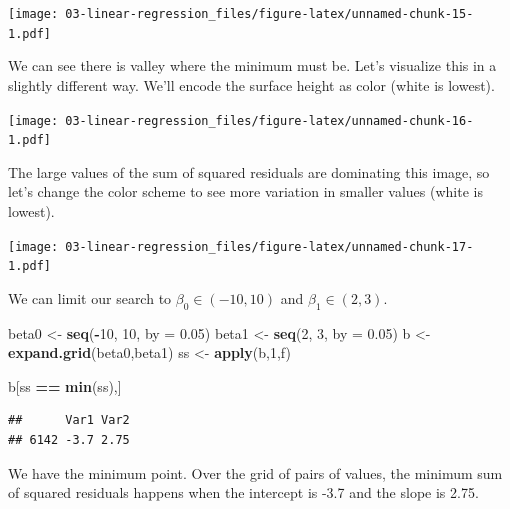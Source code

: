 \documentclass[
]{book}
\newenvironment{Shaded}{\begin{snugshade}}{\end{snugshade}}
\newcommand{\DataTypeTok}[1]{\textcolor[rgb]{0.13,0.29,0.53}{#1}}
\newcommand{\DecValTok}[1]{\textcolor[rgb]{0.00,0.00,0.81}{#1}}
\newcommand{\FloatTok}[1]{\textcolor[rgb]{0.00,0.00,0.81}{#1}}
\newcommand{\KeywordTok}[1]{\textcolor[rgb]{0.13,0.29,0.53}{\textbf{#1}}}
\newcommand{\NormalTok}[1]{#1}
\newcommand{\OperatorTok}[1]{\textcolor[rgb]{0.81,0.36,0.00}{\textbf{#1}}}
\newcommand{\StringTok}[1]{\textcolor[rgb]{0.31,0.60,0.02}{#1}}
\begin{document}
\texttt{[image: 03-linear-regression\_files/figure-latex/unnamed-chunk-15-1.pdf]}

We can see there is valley where the minimum must be. Let's visualize this in a slightly different way. We'll encode the surface height as color (white is lowest).

\texttt{[image: 03-linear-regression\_files/figure-latex/unnamed-chunk-16-1.pdf]}

The large values of the sum of squared residuals are dominating this image, so let's change the color scheme to see more variation in smaller values (white is lowest).

\texttt{[image: 03-linear-regression\_files/figure-latex/unnamed-chunk-17-1.pdf]}

We can limit our search to \(\beta_0 \in (-10,10)\) and \(\beta_1 \in (2,3)\).

\begin{Shaded}
\begin{Highlighting}[]
\NormalTok{beta0 <-}\StringTok{ }\KeywordTok{seq}\NormalTok{(}\OperatorTok{-}\DecValTok{10}\NormalTok{, }\DecValTok{10}\NormalTok{, }\DataTypeTok{by =} \FloatTok{0.05}\NormalTok{)}
\NormalTok{beta1 <-}\StringTok{ }\KeywordTok{seq}\NormalTok{(}\DecValTok{2}\NormalTok{, }\DecValTok{3}\NormalTok{, }\DataTypeTok{by =} \FloatTok{0.05}\NormalTok{)}
\NormalTok{b <-}\StringTok{ }\KeywordTok{expand.grid}\NormalTok{(beta0,beta1)}
\NormalTok{ss <-}\StringTok{ }\KeywordTok{apply}\NormalTok{(b,}\DecValTok{1}\NormalTok{,f)}

\NormalTok{b[ss }\OperatorTok{==}\StringTok{ }\KeywordTok{min}\NormalTok{(ss),]}
\end{Highlighting}
\end{Shaded}

\begin{verbatim}
##      Var1 Var2
## 6142 -3.7 2.75
\end{verbatim}

We have the minimum point. Over the grid of pairs of values, the minimum sum of squared residuals happens when the intercept is -3.7 and the slope is 2.75.
\end{document}
